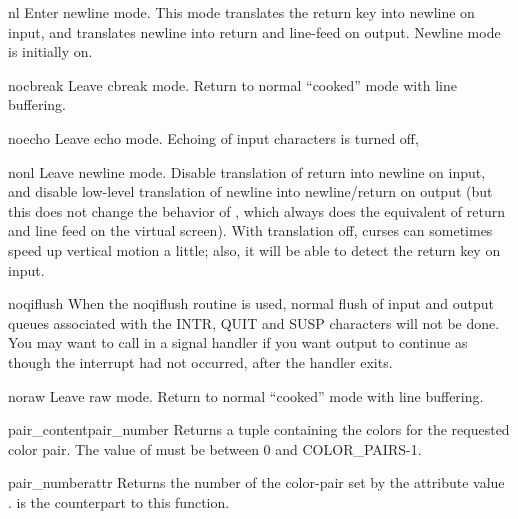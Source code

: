 \begin{funcdesc}{nl}{}
Enter newline mode.  This mode translates the return key into newline
on input, and translates newline into return and line-feed on output.
Newline mode is initially on.
\end{funcdesc}

\begin{funcdesc}{nocbreak}{}
Leave cbreak mode.  Return to normal ``cooked'' mode with line buffering.
\end{funcdesc}

\begin{funcdesc}{noecho}{}
Leave echo mode.  Echoing of input characters is turned off,
\end{funcdesc}

\begin{funcdesc}{nonl}{}
Leave newline mode.  Disable translation of return into newline on
input, and disable low-level translation of newline into
newline/return on output (but this does not change the behavior of
, which always does the equivalent of return and
line feed on the virtual screen).  With translation off, curses can
sometimes speed up vertical motion a little; also, it will be able to
detect the return key on input.
\end{funcdesc}

\begin{funcdesc}{noqiflush}{}
When the noqiflush routine is used, normal flush of input and
output queues associated with the INTR, QUIT and SUSP
characters will not be done.  You may want to call
 in a signal handler if you want output
to continue as though the interrupt had not occurred, after the
handler exits.
\end{funcdesc}

\begin{funcdesc}{noraw}{}
Leave raw mode. Return to normal ``cooked'' mode with line buffering.
\end{funcdesc}

\begin{funcdesc}{pair_content}{pair_number}
Returns a tuple  containing the colors for the requested
color pair.  The value of  must be between 0 and
COLOR_PAIRS-1.
\end{funcdesc}

\begin{funcdesc}{pair_number}{attr}
Returns the number of the color-pair set by the attribute value .
 is the counterpart to this function.
\end{funcdesc}


